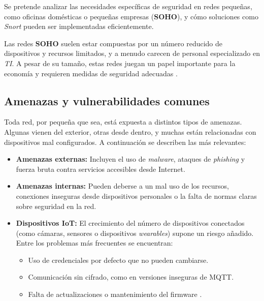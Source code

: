 \documentclass[11pt,a4paper,twoside]{report}
\begin{document}
Se pretende analizar las necesidades específicas de seguridad en redes pequeñas, como oficinas domésticas o pequeñas empresas (\textbf{SOHO}), y cómo soluciones como \textit{Snort} pueden ser implementadas eficientemente.\newline

Las redes \textbf{SOHO} suelen estar compuestas por un número reducido de dispositivos y recursos limitados, y a menudo carecen de personal especializado en \textit{TI}. A pesar de su tamaño, estas redes juegan un papel importante para la economía y requieren medidas de seguridad adecuadas \cite{ruedarevisiting}.

\subsection{Amenazas y vulnerabilidades comunes}

Toda red, por pequeña que sea, está expuesta a distintos tipos de amenazas. Algunas vienen del exterior, otras desde dentro, y muchas están relacionadas con dispositivos mal configurados. A continuación se describen las más relevantes:

\begin{itemize}
	\item \textbf{Amenazas externas:} Incluyen el uso de \textit{malware}, ataques de \textit{phishing} y fuerza bruta contra servicios accesibles desde Internet.
	
	\item \textbf{Amenazas internas:} Pueden deberse a un mal uso de los recursos, conexiones inseguras desde dispositivos personales o la falta de normas claras sobre seguridad en la red.
	
	\item \textbf{Dispositivos IoT:} El crecimiento del número de dispositivos conectados (como cámaras, sensores o dispositivos \textit{wearables}) supone un riesgo añadido. Entre los problemas más frecuentes se encuentran:
	\begin{itemize}
		\item Uso de credenciales por defecto que no pueden cambiarse.
		\item Comunicación sin cifrado, como en versiones inseguras de MQTT.
		\item Falta de actualizaciones o mantenimiento del firmware \cite{bakhshi2024review}.
	\end{itemize}
\end{itemize}
\end{document}

